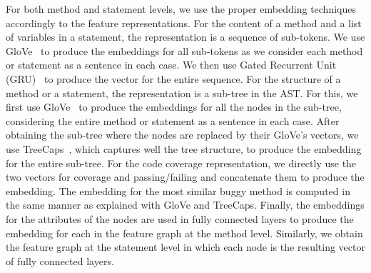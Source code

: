 For both method and statement levels, we use the proper embedding
techniques accordingly to the feature representations. For the content
of a method and a list of variables in a statement, the representation
is a sequence of sub-tokens. We use GloVe~\cite{glove2014} to produce
the embeddings for all sub-tokens as we consider each method or
statement as a sentence in each case. We then use Gated Recurrent Unit
(GRU)~\cite{cho2014learning} to produce the vector for the entire sequence. For the
structure of a method or a statement, the representation is a sub-tree
in the AST. For this, we first use GloVe~\cite{glove2014} to produce
the embeddings for all the nodes in the sub-tree, considering the
entire method or statement as a sentence in each case. After obtaining
the sub-tree where the nodes are replaced by their GloVe's vectors, we
use TreeCaps~\cite{jayasundara2019treecaps}, which captures well the tree
structure, to produce the embedding for the entire sub-tree.  For the
code coverage representation, we directly use the two vectors for
coverage and passing/failing and concatenate them to produce the
embedding. The embedding for the most similar buggy method is computed
in the same manner as explained with GloVe and TreeCaps. Finally, the
embeddings for the attributes of the nodes are used in fully connected
layers to produce the embedding for each in the feature graph at the
method level. Similarly, we obtain the feature graph at the statement
level in which each node is the resulting vector of fully connected
layers.


